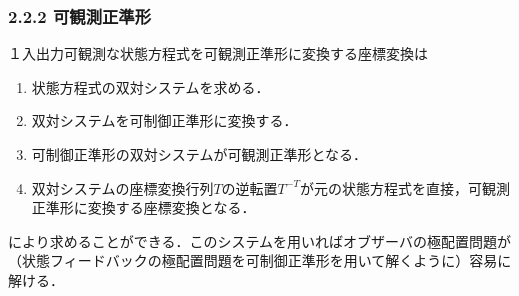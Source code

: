 \begin{frame}[t]
\frametitle{2.2.2 可観測正準形}

１入出力可観測な状態方程式を可観測正準形に変換する座標変換は
\begin{enumerate}
  \item 状態方程式の双対システムを求める．
  \item 双対システムを可制御正準形に変換する．
  \item 可制御正準形の双対システムが可観測正準形となる．
  \item 双対システムの座標変換行列$T$の逆転置$T^{-T}$が元の状態方程式を直接，可観測正準形に変換する座標変換となる．
\end{enumerate}
により求めることができる．このシステムを用いればオブザーバの極配置問題が（状態フィードバックの極配置問題を可制御正準形を用いて解くように）容易に解ける．


\end{frame}

